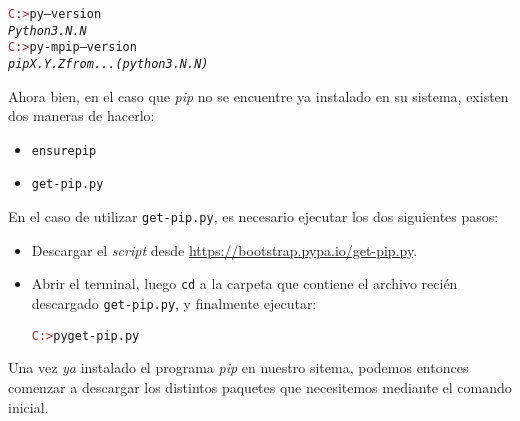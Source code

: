 \documentclass{article}
\begin{document}
\begin{enumerate}
\begin{tcolorbox}
\begin{alltt}
\textcolor{brown}{C:>} py --version
\emph{Python 3.N.N}
\textcolor{brown}{C:>} py -m pip --version
\emph{pip X.Y.Z from ... (python 3.N.N)}
\end{alltt}        
\end{tcolorbox}

\par \hspace{5pt} Ahora bien, en el caso que \emph{pip} no se encuentre ya instalado en su sistema, existen dos maneras de hacerlo:

\begin{itemize}
\item
\begin{alltt}
ensurepip
\end{alltt}
\item
\begin{alltt}
get-pip.py
\end{alltt} 
\end{itemize}

\par \hspace{5pt} En el caso de utilizar \verb|get-pip.py|, es necesario ejecutar los dos siguientes pasos:
\begin{itemize}
\item Descargar el \emph{script} desde \href{https://bootstrap.pypa.io/get-pip.py}{https://bootstrap.pypa.io/get-pip.py}.
\item Abrir el terminal, luego \verb|cd| a la carpeta que contiene el archivo recién descargado \verb|get-pip.py|, y finalmente ejecutar:
\begin{tcolorbox}
\begin{alltt}
\textcolor{brown}{C:>} py get-pip.py
\end{alltt}        
\end{tcolorbox}
\end{itemize}

\par \hspace{5pt} Una vez \emph{ya} instalado el programa \emph{pip} en nuestro sitema, podemos entonces comenzar a descargar los distintos paquetes que necesitemos mediante el comando inicial.

\end{enumerate}
\end{document}
